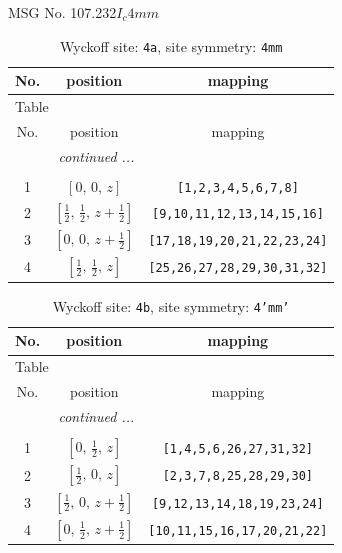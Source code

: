 \documentclass[fleqn,8pt]{jsarticle}
\begin{document}
\setcounter{MaxMatrixCols}{32}

\renewcommand{\tablename}{Table~}
\renewcommand{\figurename}{Figure~}
\begin{center}
\LARGE
MSG No. 107.232\quad$I_{c}4mm$
\end{center}
\renewcommand{\arraystretch}{1.2}
\begin{longtable}{ccc}
\caption{Wyckoff site: {\tt 4a}, site symmetry: {\tt 4mm}}
 \\
 \hline \hline
No. & position & mapping \\ \hline \endfirsthead

\multicolumn{2}{l}{\tablename\ \thetable{}} \\
 \hline \hline
No. & position & mapping \\ \hline \endhead

 \hline \hline
\multicolumn{2}{r}{\footnotesize\it continued ...} \\ \endfoot

 \hline \hline
\multicolumn{2}{r}{} \\ \endlastfoot

1 & $\left[ 0,\, 0,\, z \right]$ & {\tt [1,2,3,4,5,6,7,8]} \\ \hline
2 & $\left[ \frac{1}{2},\, \frac{1}{2},\, z + \frac{1}{2} \right]$ & {\tt [9,10,11,12,13,14,15,16]} \\ \hline
3 & $\left[ 0,\, 0,\, z + \frac{1}{2} \right]$ & {\tt [17,18,19,20,21,22,23,24]} \\ \hline
4 & $\left[ \frac{1}{2},\, \frac{1}{2},\, z \right]$ & {\tt [25,26,27,28,29,30,31,32]} \\
\end{longtable}
\renewcommand{\arraystretch}{1.2}
\begin{longtable}{ccc}
\caption{Wyckoff site: {\tt 4b}, site symmetry: {\tt 4'mm'}}
 \\
 \hline \hline
No. & position & mapping \\ \hline \endfirsthead

\multicolumn{2}{l}{\tablename\ \thetable{}} \\
 \hline \hline
No. & position & mapping \\ \hline \endhead

 \hline \hline
\multicolumn{2}{r}{\footnotesize\it continued ...} \\ \endfoot

 \hline \hline
\multicolumn{2}{r}{} \\ \endlastfoot

1 & $\left[ 0,\, \frac{1}{2},\, z \right]$ & {\tt [1,4,5,6,26,27,31,32]} \\ \hline
2 & $\left[ \frac{1}{2},\, 0,\, z \right]$ & {\tt [2,3,7,8,25,28,29,30]} \\ \hline
3 & $\left[ \frac{1}{2},\, 0,\, z + \frac{1}{2} \right]$ & {\tt [9,12,13,14,18,19,23,24]} \\ \hline
4 & $\left[ 0,\, \frac{1}{2},\, z + \frac{1}{2} \right]$ & {\tt [10,11,15,16,17,20,21,22]} \\
\end{longtable}
\end{document}
